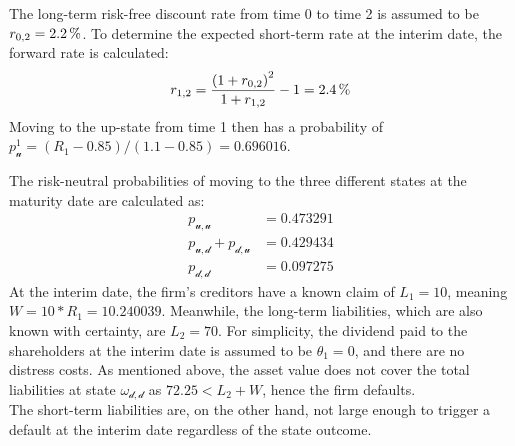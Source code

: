 \documentclass[main.tex]{subfiles}
\begin{document}
        The long-term risk-free discount rate from time 0 to time 2 is assumed to be $r_{0,2}=\pct{0.022}$.
        To determine the expected short-term rate at the interim date, the forward rate is calculated:
        \begin{equation*}
            r_{1,2} =
                \frac{
                    \left(\num{1} + r_{0,2}\right)^{2}
                }{
                    \num{1} + r_{1,2}
                }
            - \num{1}
            = \pct{0.024}
        \end{equation*}
        Moving to the up-state from time 1 then has a probability of
        $p^1_\mathscr{u}=(R_1-\num{0.85})/(\num{1.1}-\num{0.85}) = \num{0.696016}$.
        
        The risk-neutral probabilities of moving to the three different states at the maturity date are calculated as:
        \begin{align*}
            p_{\mathscr{u},\mathscr{u}}
            &=
            \num{0.473291}
            \\
            p_{\mathscr{u},\mathscr{d}} +
            p_{\mathscr{d},\mathscr{u}}
            &=
            \num{0.429434}
            \\
            p_{\mathscr{d},\mathscr{d}}
            &=
            \num{0.097275}
        \end{align*}
        \indent
        At the interim date, the firm's creditors have a known claim of $L_{1} = \num{10}$,
        meaning $W=\num{10}*R_1=\num{10.240039}$.
        Meanwhile, the long-term liabilities, which are also known with certainty, are $L_{2} = \num{70}$.
        For simplicity, the dividend paid to the shareholders at the interim date is assumed to be $\theta_1 = 0$, and there are no distress costs.
        As mentioned above, the asset value does not cover the total liabilities at state $\omega_{\mathscr{d},\mathscr{d}}$ as $\num{72.25} < L_{2} + W$,
        hence the firm defaults.
        \\
        The short-term liabilities are, on the other hand, not large enough to trigger a default at the interim date
        regardless of the state outcome.
\end{document}
